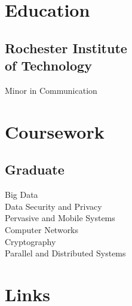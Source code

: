 \documentclass[letterpaper]{deedy-resume} %
\begin{document}
\begin{minipage}[t]{0.33\textwidth} %


\section{Education} 

\subsection[School]{Rochester Institute \\ of Technology}


\sectionspace %

\sectionspace %
Minor in Communication \\

\sectionspace %

\section{Coursework}

\subsection{Graduate}
Big Data\\
Data Security and Privacy \\
Pervasive and Mobile Systems\\
Computer Networks\\
Cryptography\\
Parallel and Distributed Systems


\section{Links} 


\end{minipage}
\end{document}
